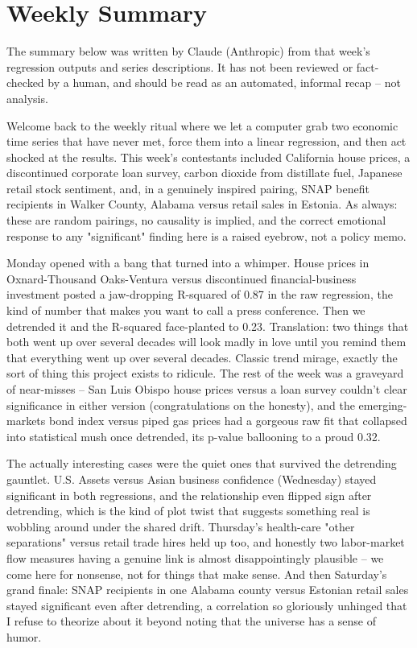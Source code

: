 \section{Weekly Summary}

\begin{tcolorbox}[colback=yellow!10,colframe=black!50,title=AI-Generated Content]
\noindent The summary below was written by Claude (Anthropic) from that week's regression outputs and series descriptions. It has not been reviewed or fact-checked by a human, and should be read as an automated, informal recap -- not analysis.
\end{tcolorbox}

Welcome back to the weekly ritual where we let a computer grab two economic time series that have never met, force them into a linear regression, and then act shocked at the results. This week's contestants included California house prices, a discontinued corporate loan survey, carbon dioxide from distillate fuel, Japanese retail stock sentiment, and, in a genuinely inspired pairing, SNAP benefit recipients in Walker County, Alabama versus retail sales in Estonia. As always: these are random pairings, no causality is implied, and the correct emotional response to any "significant" finding here is a raised eyebrow, not a policy memo.

Monday opened with a bang that turned into a whimper. House prices in Oxnard-Thousand Oaks-Ventura versus discontinued financial-business investment posted a jaw-dropping R-squared of 0.87 in the raw regression, the kind of number that makes you want to call a press conference. Then we detrended it and the R-squared face-planted to 0.23. Translation: two things that both went up over several decades will look madly in love until you remind them that everything went up over several decades. Classic trend mirage, exactly the sort of thing this project exists to ridicule. The rest of the week was a graveyard of near-misses -- San Luis Obispo house prices versus a loan survey couldn't clear significance in either version (congratulations on the honesty), and the emerging-markets bond index versus piped gas prices had a gorgeous raw fit that collapsed into statistical mush once detrended, its p-value ballooning to a proud 0.32.

The actually interesting cases were the quiet ones that survived the detrending gauntlet. U.S. Assets versus Asian business confidence (Wednesday) stayed significant in both regressions, and the relationship even flipped sign after detrending, which is the kind of plot twist that suggests something real is wobbling around under the shared drift. Thursday's health-care "other separations" versus retail trade hires held up too, and honestly two labor-market flow measures having a genuine link is almost disappointingly plausible -- we come here for nonsense, not for things that make sense. And then Saturday's grand finale: SNAP recipients in one Alabama county versus Estonian retail sales stayed significant even after detrending, a correlation so gloriously unhinged that I refuse to theorize about it beyond noting that the universe has a sense of humor.

